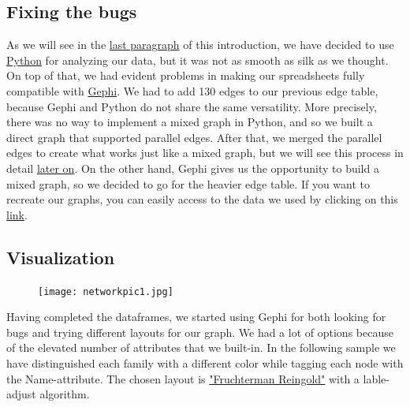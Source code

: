 \documentclass{article}
\begin{document}
\subsection*{\textcolor{Titoli}{Fixing the bugs}}
As we will see in the \hyperlink{Analysis}{last paragraph} of this introduction, we have decided to use \href{https://www.python.org/}{Python} for analyzing our data, but it was not as smooth as silk as we thought. On top of that, we had evident problems in making our spreadsheets fully compatible with \href{https://gephi.org/}{Gephi}. We had to add 130 edges to our previous edge table, because Gephi and Python do not share the same versatility. More precisely, there was no way to implement a mixed graph in Python, and so we built a direct graph that supported parallel edges. After that, we merged the parallel edges to create what works just like a mixed graph, but we will see this process in detail \hyperlink{Analysis}{later on}. On the other hand, Gephi gives us the opportunity to build a mixed graph, so we decided to go for the heavier edge table. If you want to recreate our graphs, you can easily access to the data we used by clicking on this \href{https://github.com/TizianoIannaccio/Network-Analytics}{link}.
\newpage



\subsection*{\textcolor{Titoli}{Visualization}}
\label{sec:Visualization}



\begin{figure}[t!]
\vspace{-250pt}
\centering
\texttt{[image: networkpic1.jpg]}
\advance\leftskip-3.52cm
\end{figure}



\pagecolor{white}\afterpage{\pagecolor{Pagine}}
Having completed the dataframes, we started using Gephi for both looking for bugs and trying different layouts for our graph. We had a lot of options because of the elevated number of attributes that we built-in. In the following sample we have distinguished each family with a different color while tagging each node with the Name-attribute. The chosen layout is \href{https://github.com/gephi/gephi/wiki/Fruchterman-Reingold}{"Fruchterman Reingold"} with a lable-adjust algorithm.
\end{document}
